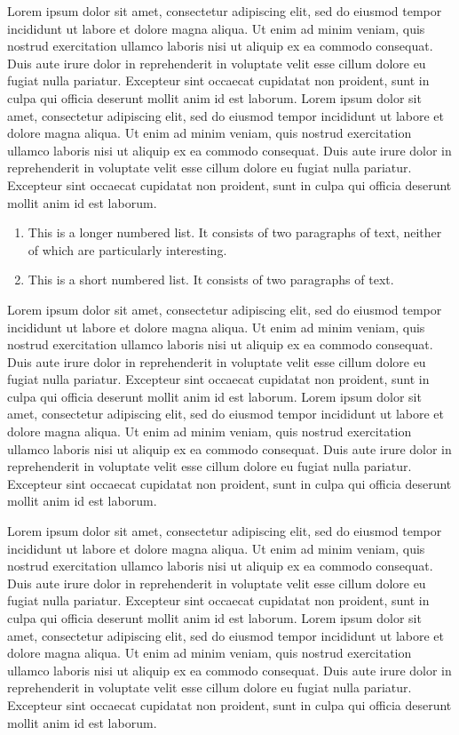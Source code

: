 \documentclass{sbc2023}%
\begin{document}
Lorem ipsum dolor sit amet, consectetur adipiscing elit, sed do eiusmod tempor incididunt ut labore et dolore magna aliqua. Ut enim ad minim veniam, quis nostrud exercitation ullamco laboris nisi ut aliquip ex ea commodo consequat. Duis aute irure dolor in reprehenderit in voluptate velit esse cillum dolore eu fugiat nulla pariatur. Excepteur sint occaecat cupidatat non proident, sunt in culpa qui officia deserunt mollit anim id est laborum. Lorem ipsum dolor sit amet, consectetur adipiscing elit, sed do eiusmod tempor incididunt ut labore et dolore magna aliqua. Ut enim ad minim veniam, quis nostrud exercitation ullamco laboris nisi ut aliquip ex ea commodo consequat. Duis aute irure dolor in reprehenderit in voluptate velit esse cillum dolore eu fugiat nulla pariatur. Excepteur sint occaecat cupidatat non proident, sunt in culpa qui officia deserunt mollit anim id est laborum.

\begin{enumerate}%
\item This is a longer numbered list. It consists of two paragraphs of text, neither of which are particularly interesting.
\item This is a short numbered list. It consists of two paragraphs of text.
\end{enumerate}

Lorem ipsum dolor sit amet, consectetur adipiscing elit, sed do eiusmod tempor incididunt ut labore et dolore magna aliqua. Ut enim ad minim veniam, quis nostrud exercitation ullamco laboris nisi ut aliquip ex ea commodo consequat. Duis aute irure dolor in reprehenderit in voluptate velit esse cillum dolore eu fugiat nulla pariatur. Excepteur sint occaecat cupidatat non proident, sunt in culpa qui officia deserunt mollit anim id est laborum. Lorem ipsum dolor sit amet, consectetur adipiscing elit, sed do eiusmod tempor incididunt ut labore et dolore magna aliqua. Ut enim ad minim veniam, quis nostrud exercitation ullamco laboris nisi ut aliquip ex ea commodo consequat. Duis aute irure dolor in reprehenderit in voluptate velit esse cillum dolore eu fugiat nulla pariatur. Excepteur sint occaecat cupidatat non proident, sunt in culpa qui officia deserunt mollit anim id est laborum.

Lorem ipsum dolor sit amet, consectetur adipiscing elit, sed do eiusmod tempor incididunt ut labore et dolore magna aliqua. Ut enim ad minim veniam, quis nostrud exercitation ullamco laboris nisi ut aliquip ex ea commodo consequat. Duis aute irure dolor in reprehenderit in voluptate velit esse cillum dolore eu fugiat nulla pariatur. Excepteur sint occaecat cupidatat non proident, sunt in culpa qui officia deserunt mollit anim id est laborum. Lorem ipsum dolor sit amet, consectetur adipiscing elit, sed do eiusmod tempor incididunt ut labore et dolore magna aliqua. Ut enim ad minim veniam, quis nostrud exercitation ullamco laboris nisi ut aliquip ex ea commodo consequat. Duis aute irure dolor in reprehenderit in voluptate velit esse cillum dolore eu fugiat nulla pariatur. Excepteur sint occaecat cupidatat non proident, sunt in culpa qui officia deserunt mollit anim id est laborum.
\end{document}
